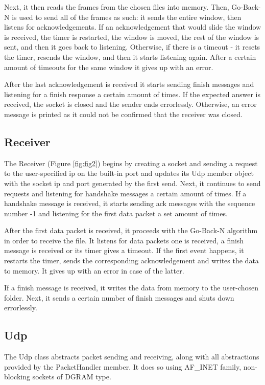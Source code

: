 \documentclass[12pt]{article}
\begin{document}
Next, it then reads the frames from the chosen files into memory. Then, Go-Back-N is used to send all of the frames as such: it sends the entire window, then listens for acknowledgements. If an acknowledgement that would slide the window is received, the timer is restarted, the window is moved, the rest of the window is sent, and then it goes back to listening. Otherwise, if there is a timeout - it resets the timer, resends the window, and then it starts listening again. After a certain amount of timeouts for the same window it gives up with an error.

After the last acknowledgement is received it starts sending finish messages and listening for a finish response a certain amount of times. If the expected answer is received, the socket is closed and the sender ends errorlessly. Otherwise, an error message is printed as it could not be confirmed that the receiver was closed.

\subsection{Receiver}

The Receiver (Figure \ref{fig:fig2}) begins by creating a socket and sending a request to the user-specified ip on the built-in port and updates its Udp member object with the socket ip and port generated by the first send. Next, it continues to send requests and listening for handshake messages a certain amount of times. If a handshake message is received, it starts sending ack messages with the sequence number -1 and listening for the first data packet a set amount of times.

After the first data packet is received, it proceeds with the Go-Back-N algorithm in order to receive the file. It listens for data packets one is received, a finish message is received or its timer gives a timeout. If the first event happens, it restarts the timer, sends the corresponding acknowledgement and writes the data to memory. It gives up with an error in case of the latter.

If a finish message is received, it writes the data from memory to the user-chosen folder. Next, it sends a certain number of finish messages and shuts down errorlessly.

\subsection{Udp}

The Udp class abstracts packet sending and receiving, along with all abstractions provided by the PacketHandler member. It does so using AF\_INET family, non-blocking sockets of DGRAM type.
\end{document}
